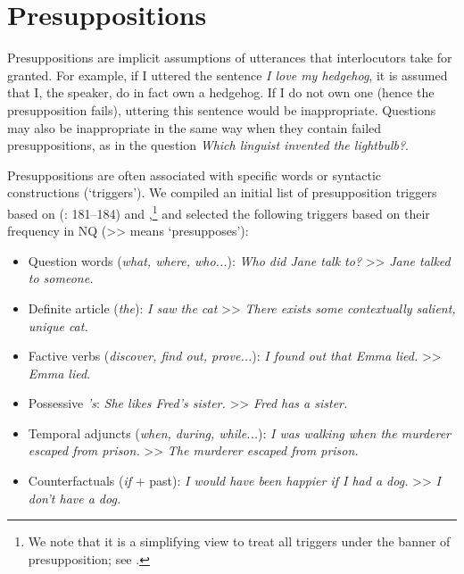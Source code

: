 \documentclass[11pt,a4paper]{article}
\begin{document}
\section{Presuppositions}
\label{sec:presups}
Presuppositions are implicit assumptions of utterances that interlocutors take for granted. For example, if I uttered the sentence \textit{I love my hedgehog}, it is assumed that I, the speaker, do in fact own a hedgehog. If I do not own one (hence the presupposition fails), uttering this sentence would be inappropriate. Questions may also be inappropriate in the same way when they contain failed presuppositions, as in the question \textit{Which linguist invented the lightbulb?}.

Presuppositions are often associated with specific words or syntactic constructions (`triggers'). We compiled an initial list of presupposition triggers based on \citeauthor{levinson_1983} (\citeyear{levinson_1983}: 181--184) and \citet{van1992presupposition},\footnote{We note that it is a simplifying view to treat all triggers under the banner of presupposition; see \citet{karttunen2016presupposition}.} and selected the following triggers based on their frequency in NQ (>> means `presupposes'):

\begin{itemize}
\itemsep -2pt
    \item Question words (\textit{what, where, who...}): \textit{Who did Jane talk to?} >> \textit{Jane talked to someone.}
    \item Definite article (\textit{the}): \textit{I saw the cat} >> \textit{There exists some contextually salient, unique cat.}
    \item Factive verbs (\textit{discover, find out, prove...}): \textit{I found out that Emma lied.} >> \textit{Emma lied}.
    \item Possessive \textit{'s}: \textit{She likes Fred's sister.} >> \textit{Fred has a sister.}
    \item Temporal adjuncts (\textit{when, during, while...}): \textit{I was walking when the murderer escaped from prison.} >> \textit{The murderer escaped from prison.}
    \item Counterfactuals (\textit{if} + past): \textit{I would have been happier if I had a dog.} >> \textit{I don't have a dog.}
\end{itemize}
\end{document}
